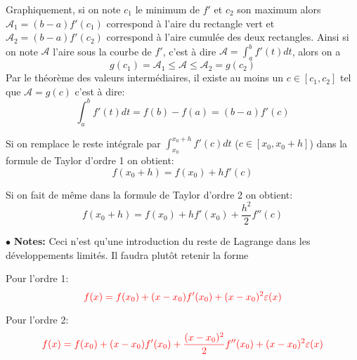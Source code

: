 \documentclass[a4paper]{article}
\theoremstyle{break}
\newcommand{\note}{$\bullet$ \textbf{Notes: }}
\begin{document}
\begin{center}
\end{center}

Graphiquement, si on note $c_1$ le minimum de $f'$ et $c_2$ son
maximum alors $\mathcal{A}_1 = (b-a) f'(c_1)$ correspond à l'aire du
rectangle vert et $\mathcal{A}_2 = (b-a) f'(c_2)$ correspond à l'aire
cumulée des deux rectangles. Ainsi si on note $\mathcal{A}$ l'aire
sous la courbe de $f'$, c'est à dire $\mathcal{A} = \int_a^b f'(t)dt$,
alors on a
\[
  g(c_1) = \mathcal{A}_1 \leq \mathcal{A} \leq \mathcal{A}_2 = g(c_2)
\]
Par le théorème des valeurs intermédiaires, il existe au moins un $c
\in [c_1,c_2]$ tel que $\mathcal{A} = g(c)$ c'est à dire:
\[
  \int_a^b f'(t) dt = f(b) - f(a) = (b-a)f'(c)
\]

Si on remplace le reste intégrale par $\int_{x_0}^{x_0+h} f'(c) dt$
($c \in [x_0, x_0+h]$) dans la formule de Taylor d'ordre 1
on obtient:
\[
  f(x_0 +h) = f(x_0) + hf'(c)
\]

Si on fait de même dans la formule de Taylor d'ordre 2 on obtient:
\[
  f(x_0 +h) = f(x_0) + hf'(x_0) + \frac{h^2}{2}f''(c)
\]

\note Ceci n'est qu'une introduction du reste de Lagrange dans les
développements limités. Il faudra plutôt retenir la forme

Pour l'ordre 1:
\[
    \color{red}{
      f(x) = f(x_0) + (x-x_0)f'(x_0) + (x-x_0)^2 \varepsilon(x) }
\]

Pour l'ordre 2:
\[
    \color{red}{
    f(x) = f(x_0) + (x-x_0)f'(x_0) + \frac{(x-x_0)^2}{2} f''(x_0)
    + (x-x_0)^2 \varepsilon(x) }
\]
\end{document}
